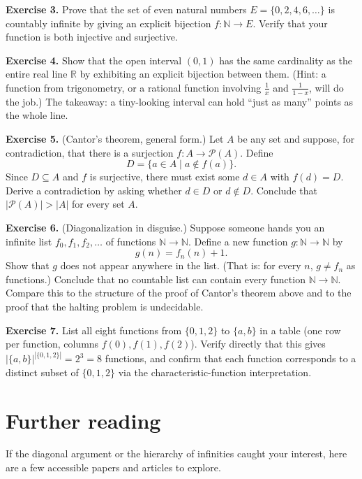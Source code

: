 \documentclass[11pt]{article}
\begin{document}
\bigskip
\textbf{Exercise 3.}\label{ex:m1b:3} Prove that the set of even natural numbers $E = \{0, 2, 4, 6, \ldots\}$ is countably infinite by giving an explicit bijection $f : \mathbb{N} \to E$. Verify that your function is both injective and surjective.

\bigskip
\textbf{Exercise 4.}\label{ex:m1b:4} Show that the open interval $(0, 1)$ has the same cardinality as the entire real line $\mathbb{R}$ by exhibiting an explicit bijection between them. (Hint: a function from trigonometry, or a rational function involving $\frac{1}{x}$ and $\frac{1}{1-x}$, will do the job.) The takeaway: a tiny-looking interval can hold ``just as many'' points as the whole line.

\bigskip
\textbf{Exercise 5.}\label{ex:m1b:5} (Cantor's theorem, general form.) Let $A$ be any set and suppose, for contradiction, that there is a surjection $f : A \to \mathcal{P}(A)$. Define
\[
  D = \{ a \in A \mid a \notin f(a) \}.
\]
Since $D \subseteq A$ and $f$ is surjective, there must exist some $d \in A$ with $f(d) = D$. Derive a contradiction by asking whether $d \in D$ or $d \notin D$. Conclude that $|\mathcal{P}(A)| > |A|$ for every set $A$.

\bigskip
\textbf{Exercise 6.}\label{ex:m1b:6} (Diagonalization in disguise.) Suppose someone hands you an infinite list $f_0, f_1, f_2, \ldots$ of functions $\mathbb{N} \to \mathbb{N}$. Define a new function $g : \mathbb{N} \to \mathbb{N}$ by
\[
  g(n) = f_n(n) + 1.
\]
Show that $g$ does not appear anywhere in the list. (That is: for every $n$, $g \neq f_n$ as functions.) Conclude that no countable list can contain every function $\mathbb{N} \to \mathbb{N}$. Compare this to the structure of the proof of Cantor's theorem above and to the proof that the halting problem is undecidable.

\bigskip
\textbf{Exercise 7.}\label{ex:m1b:7} List all eight functions from $\{0, 1, 2\}$ to $\{a, b\}$ in a table (one row per function, columns $f(0), f(1), f(2)$). Verify directly that this gives $|\{a,b\}|^{|\{0,1,2\}|} = 2^3 = 8$ functions, and confirm that each function corresponds to a distinct subset of $\{0, 1, 2\}$ via the characteristic-function interpretation.

\section*{Further reading}

If the diagonal argument or the hierarchy of infinities caught your interest, here are a few accessible papers and articles to explore.
\end{document}
